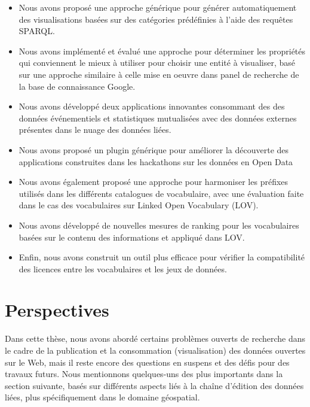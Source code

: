 \documentclass[a4paper,11pt,twoside]{report}
\begin{document}
\begin{itemize}
 \item Nous avons proposé une approche générique pour générer automatiquement des visualisations basées sur des catégories prédéfinies à l'aide des requêtes SPARQL.
 \item Nous avons implémenté et évalué une approche pour déterminer les propriétés qui conviennent le mieux à utiliser pour choisir une entité à visualiser, basé sur une approche similaire à celle mise en oeuvre dans panel de recherche de la base de connaissance Google.
 \item Nous avons développé deux applications innovantes consommant des des données événementiels et statistiques mutualisées avec des données externes présentes dans le nuage des données liées.
 \item Nous avons proposé un plugin générique pour améliorer la découverte des applications construites dans les hackathons sur les données en Open Data
 \item Nous avons également proposé une approche pour harmoniser les préfixes utilisés dans les différents catalogues de vocabulaire, avec une évaluation faite dans le cas des vocabulaires  sur Linked Open Vocabulary (LOV).
 \item Nous avons développé de nouvelles mesures de ranking pour les vocabulaires basées sur le contenu des informations et appliqué dans LOV.
 \item Enfin, nous avons construit un outil plus efficace pour vérifier la compatibilité des licences entre les vocabulaires et les jeux de données.
\end{itemize}

\section*{Perspectives}
\label{sec:future}
Dans cette thèse, nous avons abordé certains problèmes ouverts de recherche dans le cadre de la publication et la consommation (visualisation) des données ouvertes sur le Web, mais il reste encore des questions en suspens et des défis pour des travaux futurs. Nous mentionnons quelques-uns des plus importants dans la section suivante, basés sur différents aspects liés à la chaîne d'édition des données liées, plus spécifiquement dans le domaine géospatial.
\end{document}
